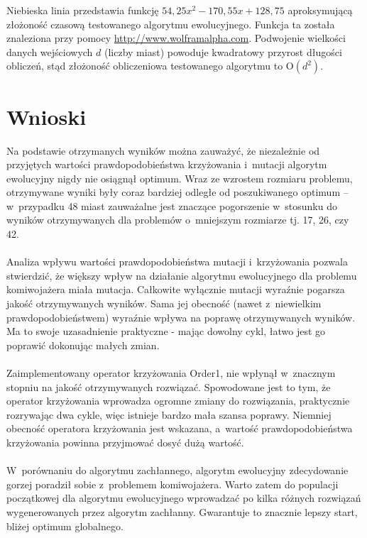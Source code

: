 \documentclass[12pt, a4paper]{article}
\begin{document}
Niebieska linia przedstawia funkcję $54,25x^2 - 170,55x + 128,75$ aproksymującą
złożoność czasową testowanego algorytmu ewolucyjnego. Funkcja ta została znaleziona przy pomocy
\url{http://www.wolframalpha.com}. Podwojenie wielkości danych wejściowych $d$ (liczby miast) powoduje
kwadratowy przyrost długości obliczeń, stąd złożoność obliczeniowa 
testowanego algorytmu to O$(d^2)$.

\section{Wnioski}
Na podstawie otrzymanych wyników można zauważyć, że niezależnie od przyjętych wartości 
prawdopodobieństwa krzyżowania i~mutacji algorytm ewolucyjny nigdy nie osiągnął optimum.
 Wraz ze wzrostem rozmiaru problemu, otrzymywane wyniki były coraz bardziej odległe od 
poszukiwanego optimum -- w~przypadku 48 miast zauważalne jest znaczące pogorszenie w~stosunku 
do wyników otrzymywanych dla problemów o~mniejszym rozmiarze tj. 17, 26, czy 42.\\
\\
Analiza wpływu wartości prawdopodobieństwa mutacji i~krzyżowania pozwala stwierdzić, 
że większy wpływ na działanie algorytmu ewolucyjnego dla problemu komiwojażera miała mutacja. 
Całkowite wyłącznie mutacji wyraźnie pogarsza jakość otrzymywanych wyników. 
Sama jej obecność (nawet z~niewielkim prawdopodobieństwem) wyraźnie wpływa na poprawę 
otrzymywanych wyników. Ma to swoje uzasadnienie praktyczne - mając dowolny cykl, łatwo
jest go poprawić dokonując małych zmian.\\
\\
Zaimplementowany operator krzyżowania Order1, nie wpłynął w~znacznym 
stopniu na jakość otrzymywanych rozwiązać. Spowodowane jest to tym, że
operator krzyżowania wprowadza ogromne zmiany do rozwiązania, praktycznie rozrywając dwa cykle, 
więc istnieje bardzo mała szansa poprawy. Niemniej obecność operatora krzyżowania jest wskazana, 
a~wartość prawdopodobieństwa krzyżowania powinna przyjmować dosyć dużą wartość.\\
\\
W~porównaniu do algorytmu zachłannego, algorytm ewolucyjny zdecydowanie gorzej poradził sobie 
z~problemem komiwojażera. Warto zatem do populacji początkowej dla algorytmu ewolucyjnego
wprowadzać po kilka różnych rozwiązań wygenerowanych przez algorytm zachłanny. Gwarantuje to znacznie lepszy
start, bliżej optimum globalnego. 

\nocite{*}


\end{document}
